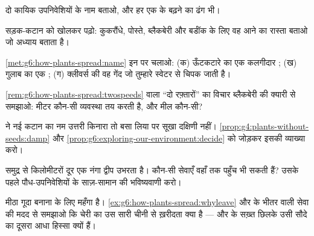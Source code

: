 \begin{exercise}[$\star$]\label{exo:g6:how-plants-spread:6}
दो कायिक उपनिवेशियों के नाम बताओ, और हर एक के बढ़ने का ढंग भी।
\end{exercise}

\begin{exercise}[$\star\star$]\label{exo:g6:how-plants-spread:7}
सड़क-कटान को खोलकर पढ़ो: कुकरौंधे, पोस्ते, ब्लैकबेरी और बर्डॉक के लिए
वह आने का रास्ता बताओ जो अध्याय बताता है।
\end{exercise}

\begin{exercise}[$\star\star$]\label{exo:g6:how-plants-spread:8}
\cref{met:g6:how-plants-spread:name} इन पर चलाओ: (क) ऊँटकटारे का एक
कलगीदार ; (ख) गुलाब का एक ; (ग) क्लीवर्स की वह गेंद जो तुम्हारे
स्वेटर से चिपक जाती है।
\end{exercise}

\begin{exercise}[$\star\star$]\label{exo:g6:how-plants-spread:9}
\cref{rem:g6:how-plants-spread:twospeeds} वाला ``दो रफ़्तारों'' का
विचार ब्लैकबेरी की क्यारी से समझाओ: मीटर कौन-सी व्यवस्था तय करती है,
और मील कौन-सी?
\end{exercise}

\begin{exercise}[$\star\star$]\label{exo:g6:how-plants-spread:10}
 ने नई कटान का नम उत्तरी किनारा तो बसा लिया पर सूखा दक्षिणी नहीं।
\cref{prop:g4:plants-without-seeds:damp} और
\cref{prop:g6:exploring-our-environment:decide} को जोड़कर इसकी व्याख्या
करो।
\end{exercise}

\begin{exercise}[$\star\star$]\label{exo:g6:how-plants-spread:11}
समुद्र से किलोमीटरों दूर एक नंगा द्वीप उभरता है। कौन-सी  सेवाएँ
वहाँ तक पहुँच भी सकती हैं? उसके पहले पौध-उपनिवेशियों के साज़-सामान की
भविष्यवाणी करो।
\end{exercise}

\begin{exercise}[$\star\star\star$]\label{exo:g6:how-plants-spread:12}
मीठा गूदा बनाना  के लिए महँगा है।
\cref{ex:g6:how-plants-spread:whyleave} और  के भीतर वाली सेवा की
मदद से समझाओ कि चेरी का  उस सारी चीनी से ख़रीदता क्या है --- और
 के सख़्त छिलके उसी सौदे का दूसरा आधा हिस्सा क्यों हैं।
\end{exercise}

